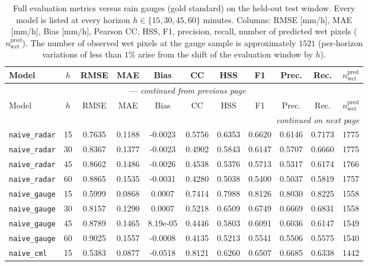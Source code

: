 \documentclass[12pt, a4paper]{article}
\begin{document}
{\footnotesize
\begin{longtable}{p{4.0cm}cccccccccc}
\caption{Full evaluation metrics versus rain gauges (gold standard) on the held-out test window. Every model is listed at every horizon $h\in\{15, 30, 45, 60\}$ minutes. Columns: RMSE [mm/h], MAE [mm/h], Bias [mm/h], Pearson CC, HSS, F1, precision, recall, number of predicted wet pixels ($n_{\text{wet}}^{\text{pred}}$). The number of observed wet pixels at the gauge sample is approximately $1521$ (per-horizon variations of less than $1\%$ arise from the shift of the evaluation window by $h$).}\label{tab:app_gauges} \\
\toprule
Model & $h$ & RMSE & MAE & Bias & CC & HSS & F1 & Prec. & Rec. & $n_{\text{wet}}^{\text{pred}}$ \\
\midrule
\endfirsthead
\multicolumn{11}{c}{\tablename\ \thetable{} --- \textit{continued from previous page}} \\
\toprule
Model & $h$ & RMSE & MAE & Bias & CC & HSS & F1 & Prec. & Rec. & $n_{\text{wet}}^{\text{pred}}$ \\
\midrule
\endhead
\midrule
\multicolumn{11}{r}{\textit{continued on next page}} \\
\endfoot
\bottomrule
\endlastfoot
\texttt{naive\_radar} & 15 & 0.7635 & 0.1188 & -0.0023 & 0.5756 & 0.6353 & 0.6620 & 0.6146 & 0.7173 & 1775 \\
\texttt{naive\_radar} & 30 & 0.8367 & 0.1377 & -0.0023 & 0.4902 & 0.5843 & 0.6147 & 0.5707 & 0.6660 & 1775 \\
\texttt{naive\_radar} & 45 & 0.8662 & 0.1486 & -0.0026 & 0.4538 & 0.5376 & 0.5713 & 0.5317 & 0.6174 & 1766 \\
\texttt{naive\_radar} & 60 & 0.8865 & 0.1535 & -0.0031 & 0.4280 & 0.5038 & 0.5400 & 0.5037 & 0.5819 & 1757 \\
\addlinespace[1pt]
\texttt{naive\_gauge} & 15 & 0.5999 & 0.0868 & 0.0007 & 0.7414 & 0.7988 & 0.8126 & 0.8030 & 0.8225 & 1558 \\
\texttt{naive\_gauge} & 30 & 0.8157 & 0.1290 & 0.0007 & 0.5218 & 0.6509 & 0.6749 & 0.6669 & 0.6831 & 1558 \\
\texttt{naive\_gauge} & 45 & 0.8789 & 0.1465 & 8.19e-05 & 0.4446 & 0.5803 & 0.6091 & 0.6036 & 0.6147 & 1549 \\
\texttt{naive\_gauge} & 60 & 0.9025 & 0.1557 & -0.0008 & 0.4135 & 0.5213 & 0.5541 & 0.5506 & 0.5575 & 1540 \\
\addlinespace[1pt]
\texttt{naive\_cml} & 15 & 0.5383 & 0.0877 & -0.0518 & 0.8121 & 0.6260 & 0.6507 & 0.6685 & 0.6338 & 1442 \\

\end{longtable}}
\end{document}
